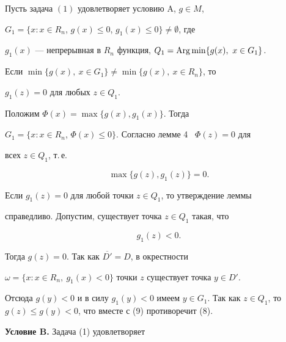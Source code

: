 \begin{lem}


Пусть задача $(1)$ удовлетворяет условию $\mathrm A$, $g\in M$,


$G_1=\{x: x\in R_n$, $g(x)\le 0$, $g_1(x)\le 0\}\ne\emptyset$, где


$g_1(x)$ --- непрерывная в $R_n$ функция, $Q_1=\operatorname{Arg}\min\{g(x),\ x\in G_1\}$. 


Если $\min\{g(x),\ x\in G_1\}\ne\min\{g(x),\ x\in R_n\}$, то 


$g_1(z)=0$ для любых $z\in Q_1$.


\end{lem}





\begin{pf}


Положим $\Phi(x)=\max\{ g(x), g_1(x)\}$. Тогда


$G_1=\{ x: x\in R_n$, $\Phi(x)\le 0\}$. Согласно лемме 4 \ $\Phi(z)=0$ для


всех $z\in Q_1$, т.\,е.


\begin{equation}


\max\{ g(z), g_1(z)\}=0.


\end{equation}





Если $g_1(z)=0$ для любой точки $z\in Q_1$, то утверждение леммы 


справедливо. Допустим, существует точка $z\in Q_1$ такая, что


\begin{equation}


g_1(z)<0.


\end{equation}


Тогда $g(z)=0$. Так как $\overline{D'}=D$, в окрестности


$\omega=\{x: x\in R_n,\ g_1(x)<0\}$ точки $z$ существует точка $y\in D'$.


Отсюда $g(y)<0$ и в силу $g_1(y)<0$ имеем $y\in G_1$. Так как $z\in


Q_1$, то $g(z)\le g(y)<0$, что вместе с (9) противоречит (8).


\end{pf}





{\bf Условие B.} Задача (1) удовлетворяет


